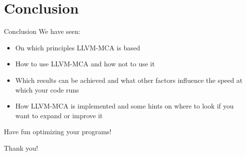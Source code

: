 
\section{Conclusion}


\begin{frame}{Conclusion}
We have seen:
\begin{itemize}
\item On which principles LLVM-MCA is based
\item How to use LLVM-MCA and how \alert{not} to use it
\item Which results can be achieved and what other factors 
	influence the speed at which your code runs
\item How LLVM-MCA is implemented and some hints on where to look
	if you want to expand or improve it
\end{itemize}
\bigskip
Have fun optimizing your programs!
\end{frame}


\begin{frame}{}
\begin{center}
\Huge
Thank you!
\end{center}
\end{frame}

